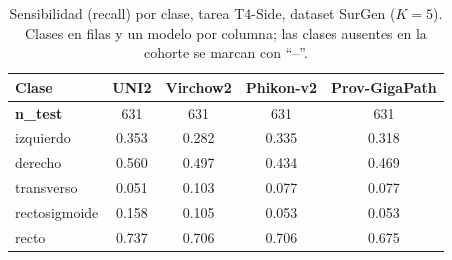\begin{table}[H]
\centering
\caption{Sensibilidad (recall) por clase, tarea T4-Side, dataset SurGen ($K=5$). Clases en filas y un modelo por columna; las clases ausentes en la cohorte se marcan con ``--''.}
\label{tab:anexo_side_sensibilidad_surgen}
\begin{tabular}{l c c c c}
\toprule
\textbf{Clase} & \textbf{UNI2} & \textbf{Virchow2} & \textbf{Phikon-v2} & \textbf{Prov-GigaPath} \\
\midrule
\textbf{n\_test} & 631 & 631 & 631 & 631 \\
izquierdo & 0.353 & 0.282 & 0.335 & 0.318 \\
derecho & 0.560 & 0.497 & 0.434 & 0.469 \\
transverso & 0.051 & 0.103 & 0.077 & 0.077 \\
rectosigmoide & 0.158 & 0.105 & 0.053 & 0.053 \\
recto & 0.737 & 0.706 & 0.706 & 0.675 \\
\bottomrule
\end{tabular}
\end{table}

